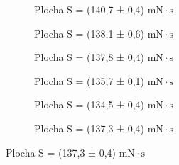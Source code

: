 \begin{figure}[H]
        \centering

        \begin{subfigure}[t]{0.3\textwidth}
            \centering
            
            \caption{
                Plocha S = (140,7 ± 0,4) $\mathrm{mN \cdot s}$
            }
            \label{fig:integrales-2a}
        \end{subfigure}%
    \hfill
\begin{subfigure}[t]{0.3\textwidth}
            \centering
            
            \caption{
                Plocha S = (138,1 ± 0,6) $\mathrm{mN \cdot s}$
            }
            \label{fig:integrales-2b}
        \end{subfigure}%
    \hfill
\begin{subfigure}[t]{0.3\textwidth}
            \centering
            
            \caption{
                Plocha S = (137,8 ± 0,4) $\mathrm{mN \cdot s}$
            }
            \label{fig:integrales-2c}
        \end{subfigure}

    \vspace{0.5em}
\begin{subfigure}[t]{0.3\textwidth}
            \centering
            
            \caption{
                Plocha S = (135,7 ± 0,1) $\mathrm{mN \cdot s}$
            }
            \label{fig:integrales-2d}
        \end{subfigure}%
    \hfill
\begin{subfigure}[t]{0.3\textwidth}
            \centering
            
            \caption{
                Plocha S = (134,5 ± 0,4) $\mathrm{mN \cdot s}$
            }
            \label{fig:integrales-2e}
        \end{subfigure}%
    \hfill
\begin{subfigure}[t]{0.3\textwidth}
            \centering
            
            \caption{
                Plocha S = (137,3 ± 0,4) $\mathrm{mN \cdot s}$
            }
            \label{fig:integrales-2f}
        \end{subfigure}


\end{figure}
